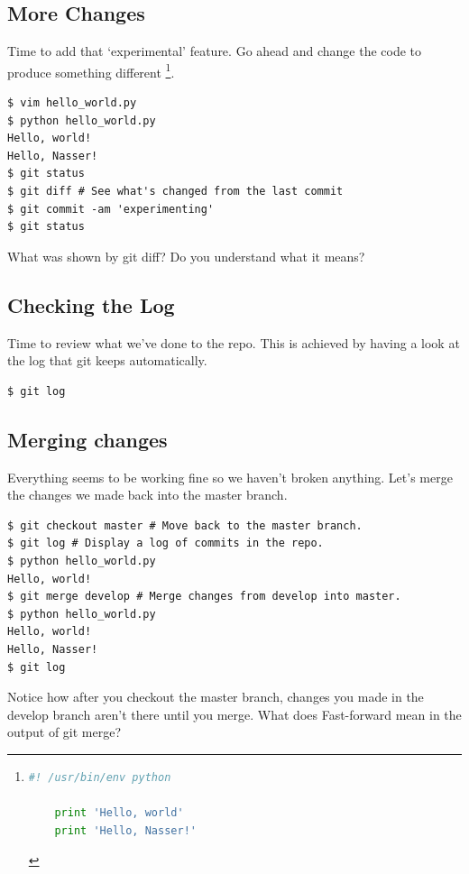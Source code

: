 \documentclass{tufte-handout}
\begin{document}
\subsection{More Changes}

\noindent Time to add that `experimental' feature. Go ahead and change the code to
produce something different \cprotect\footnote{
	\begin{lstlisting}[language=Python]
	#! /usr/bin/env python

	print 'Hello, world'
	print 'Hello, Nasser!'
	\end{lstlisting}
}.

\begin{lstlisting}
$ vim hello_world.py
$ python hello_world.py
Hello, world!
Hello, Nasser!
$ git status
$ git diff # See what's changed from the last commit
$ git commit -am 'experimenting'
$ git status
\end{lstlisting}

\noindent What was shown by git diff? Do you understand what it means?

\subsection{Checking the Log}

\noindent Time to review what we've done to the repo. This is achieved by having a look
at the log that git keeps automatically.

\begin{lstlisting}
$ git log
\end{lstlisting}

\subsection{Merging changes}
\noindent Everything seems to be working fine so we haven't broken anything. 
Let's merge the changes we made back into the master branch.

\begin{lstlisting}
$ git checkout master # Move back to the master branch.
$ git log # Display a log of commits in the repo.
$ python hello_world.py
Hello, world!
$ git merge develop # Merge changes from develop into master.
$ python hello_world.py
Hello, world!
Hello, Nasser!
$ git log
\end{lstlisting}

\noindent Notice how after you checkout the master branch, changes you made in
the develop branch aren't there until you merge. What does Fast-forward mean in
the output of git merge?
\end{document}
